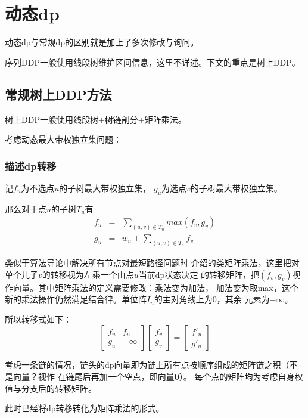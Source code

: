 \section{动态dp}
动态dp与常规dp的区别就是加上了多次修改与询问。

序列DDP一般使用线段树维护区间信息，这里不详述。下文的重点是树上DDP。
\subsection{常规树上DDP方法}
树上DDP一般使用线段树+树链剖分+矩阵乘法。

考虑动态最大带权独立集问题：
\subsubsection{描述dp转移}
记$f_u$为不选点$u$的子树最大带权独立集，
$g_u$为选点$v$的子树最大带权独立集。

那么对于点$u$的子树$T_u$有
\begin{eqnarray*}
    f_u&=&\sum_{(u,v)\in T_u}{max(f_v,g_v)}\\
    g_u&=&w_u+\sum_{(u,v)\in T_u}{f_v}
\end{eqnarray*}

类似于算法导论\cite{ITA3}中解决所有节点对最短路径问题时
介绍的类矩阵乘法，这里把对单个儿子$v$的转移视为左乘一个由点$u$当前dp状态决定
的转移矩阵，把$(f_v,g_v)$视作向量。其中矩阵乘法的定义需要修改：乘法变为加法，
加法变为取max，这个新的乘法操作仍然满足结合律。单位阵$I_n$的主对角线上为0，其余
元素为$-\infty$。

所以转移式如下：
\begin{displaymath}
    \left[
    \begin{array}{cc}
        f_u&f_u\\
        g_u&-\infty
    \end{array}\right]
    \left[
    \begin{array}{c}
        f_v\\g_v
    \end{array}\right]  =
    \left[
    \begin{array}{c}
        f'_u\\g'_u
    \end{array}\right]
\end{displaymath}

考虑一条链的情况，链头的dp向量即为链上所有点按顺序组成的矩阵链之积（不是向量？视作
在链尾后再加一个空点，即向量{\bfseries 0}）。
每个点的矩阵均为考虑自身权值与分支后的转移矩阵。

此时已经将dp转移转化为矩阵乘法的形式。

